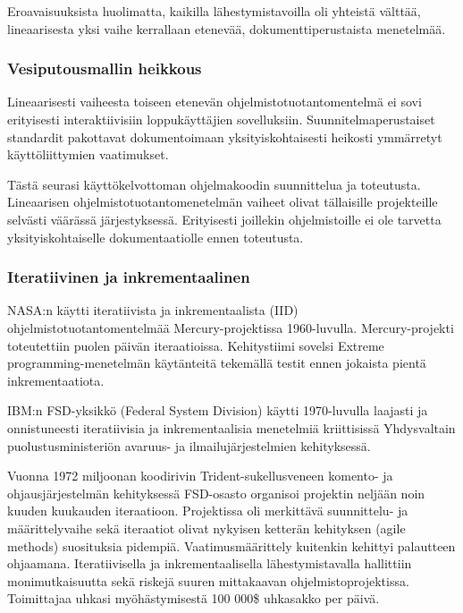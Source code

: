 \documentclass[finnish]{tktltiki2}
\theoremstyle{definition}
\theoremstyle{remark}
\begin{document}
Eroavaisuuksista huolimatta, kaikilla lähestymistavoilla oli yhteistä välttää, lineaarisesta yksi vaihe kerrallaan etenevää, dokumenttiperustaista menetelmää.\cite{LAB03}

\subsubsection{Vesiputousmallin heikkous}
Lineaarisesti vaiheesta toiseen etenevän ohjelmistotuotantomentelmä ei sovi erityisesti interaktiivisiin loppukäyttäjien sovelluksiin. Suunnitelmaperustaiset standardit pakottavat dokumentoimaan yksityiskohtaisesti heikosti ymmärretyt käyttöliittymien vaatimukset.\cite{BOE88}

Tästä seurasi käyttökelvottoman ohjelmakoodin suunnittelua ja toteutusta. Lineaarisen ohjelmistotuotantomenetelmän vaiheet olivat tällaisille projekteille selvästi väärässä järjestyksessä. Erityisesti joillekin ohjelmistoille ei ole tarvetta yksityiskohtaiselle dokumentaatiolle ennen toteutusta.\cite{BOE88}

\subsubsection{Iteratiivinen ja inkrementaalinen}

NASA:n käytti iteratiivista ja inkrementaalista (IID) ohjelmistotuotantomentelmää Mercury-projektissa 1960-luvulla. Mercury-projekti toteutettiin puolen päivän iteraatioissa. Kehitystiimi sovelsi Extreme programming-menetelmän käytänteitä tekemällä testit ennen jokaista pientä inkremen\-taatiota.\cite{LAB03}

IBM:n FSD-yksikkö (Federal System Division) käytti 1970-luvulla laajasti ja onnistuneesti iteratiivisia ja inkrementaalisia menetelmiä kriittisissä Yhdysvaltain puolustusministeriön avaruus- ja ilmailujärjestelmien kehityksessä.\cite{LAB03}

Vuonna 1972 miljoonan koodirivin Trident-sukellusveneen komento- ja ohjausjärjestelmän kehityksessä FSD-osasto organisoi projektin neljään noin kuuden kuukauden iteraatioon. Projektissa oli merkittävä suunnittelu- ja määrittelyvaihe sekä iteraatiot olivat nykyisen ketterän kehityksen (agile methods) suosituksia pidempiä. Vaatimus\-määrittely kuitenkin kehittyi palautteen ohjaamana. Iteratiivisella ja inkrementaalisella lähestymistavalla hallittiin monimutkaisuutta sekä riskejä suuren mittakaavan ohjelmistoprojektissa. Toimittajaa uhkasi myöhästymisestä 100 000\$ uhkasakko per päivä.\cite{LAB03}
\end{document}
